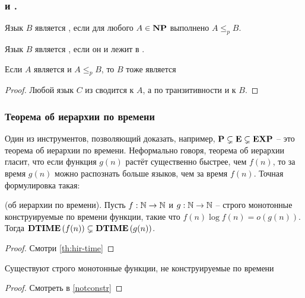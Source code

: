 \subsubsection{\nph и \npc.}

\begin{definition}
Язык $B$ является \nph, если для любого $A \in \textbf{NP}$
выполнено $A \leqslant_p B$.
\end{definition}
\begin{definition}
Язык $B$ является \npc, если он \nph и лежит в \np.
\end{definition}

\begin{statement}
Если $A$ является \nph и $A\leqslant_p B$, то $B$ тоже является \nph
\end{statement}

\begin{proof}
Любой язык $C$ из \np
сводится к $A$, а по
транзитивности и к $B$.
\end{proof}

\subsubsection{Теорема об иерархии по времени}

Один из инструментов, позволяющий доказать,
например, $\textbf{P} \subsetneq \textbf{E} \subsetneq \textbf{EXP}$ -- это теорема об иерархии по времени. Неформально говоря, теорема об иерархии гласит, что если функция $g(n)$ растёт существенно быстрее, чем $f(n)$, то за время $g(n)$ можно распознать больше языков, чем за
время $f(n)$. Точная формулировка такая:

\begin{theorem}
(об иерархии по времени). Пусть $f : \mathbb{N} \to \mathbb{N}$ и $g : \mathbb{N} \to \mathbb{N}$ -- строго
монотонные конструируемые по времени функции, такие что $f(n) \log f(n) = o(g(n))$. Тогда $\textbf{DTIME}\left({f(n)}\right) \subsetneq \textbf{DTIME}\left({g(n)}\right)$.
\end{theorem}

\begin{proof}
    Смотри \ref{th:hir-time}
\end{proof}

\begin{corollary}
Существуют строго монотонные функции, не конструируемые
по времени
\end{corollary}

\begin{proof}
    Смотреть в \ref{notconstr}
\end{proof}

